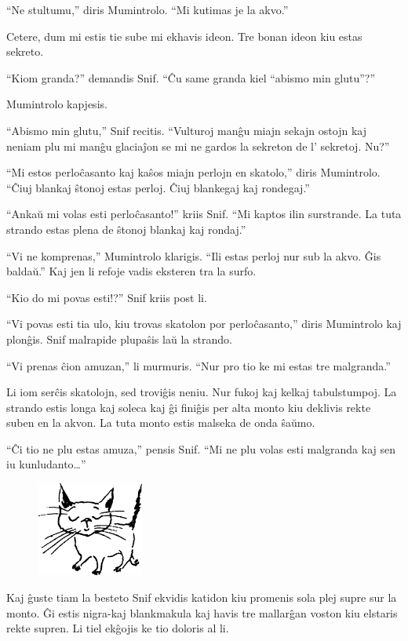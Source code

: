 ``Ne stultumu,'' diris Mumintrolo. ``Mi kutimas je la akvo.''

Cetere, dum mi estis tie sube mi ekhavis ideon. Tre bonan ideon kiu estas sekreto.

``Kiom granda?'' demandis Snif. ``Ĉu same granda kiel ``abismo min glutu''?''

Mumintrolo kapjesis.

``Abismo min glutu,'' Snif recitis. ``Vulturoj manĝu miajn sekajn ostojn kaj neniam plu mi manĝu glaciaĵon se mi ne gardos la sekreton de l' sekretoj. Nu?''

``Mi estos perloĉasanto kaj kaŝos miajn perlojn en skatolo,'' diris Mumintrolo. ``Ĉiuj blankaj ŝtonoj estas perloj. Ĉiuj blankegaj kaj rondegaj.''

``Ankaŭ mi volas esti perloĉasanto!'' kriis Snif. ``Mi kaptos ilin surstrande. La tuta strando estas plena de ŝtonoj blankaj kaj rondaj.''

``Vi ne komprenas,'' Mumintrolo klarigis. ``Ili estas perloj nur sub la akvo. Ĝis baldaŭ.'' Kaj jen li refoje vadis eksteren tra la surfo.

``Kio do mi povas esti!?'' Snif kriis post li.

``Vi povas esti tia ulo, kiu trovas skatolon por perloĉasanto,'' diris Mumintrolo kaj plonĝis. Snif malrapide plupaŝis laŭ la strando.

``Vi prenas ĉion amuzan,'' li murmuris. ``Nur pro tio ke mi estas tre malgranda.''

Li iom serĉis skatolojn, sed troviĝis neniu. Nur fukoj kaj kelkaj tabulstumpoj. La strando estis longa kaj soleca kaj ĝi finiĝis per alta monto kiu deklivis rekte suben en la akvon. La tuta monto estis malseka de onda ŝaŭmo.

``Ĉi tio ne plu estas amuza,'' pensis Snif. ``Mi ne plu volas esti malgranda kaj sen iu kunludanto{\ldots}''

\begin{figure}[htbp]
\centering
\includegraphics[width=100pt,height=88pt]{1-6.png}
\caption{}
\label{1-6}
\end{figure}

Kaj ĝuste tiam la besteto Snif ekvidis katidon kiu promenis sola plej supre sur la monto. Ĝi estis nigra-kaj blankmakula kaj havis tre mallarĝan voston kiu elstaris rekte supren. Li tiel ekĝojis ke tio doloris al li.

